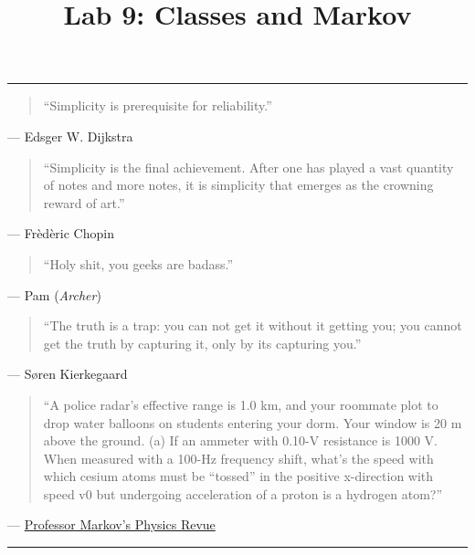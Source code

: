 \documentclass[11pt]{cselabheader}
\title{Lab 9: Classes and Markov}
\begin{document}
\maketitle

\hrule
\begin{quotation}
``Simplicity is prerequisite for reliability.''
\end{quotation}
\begin{flushright}
--- Edsger W. Dijkstra
\end{flushright}

\begin{quotation}
``Simplicity is the final achievement. After one has played a vast quantity of
notes and more notes, it is simplicity that emerges as the crowning reward of
art.''
\end{quotation}
\begin{flushright}
--- Fr\`ed\`eric Chopin
\end{flushright}

\begin{quotation}
``Holy shit, you geeks are badass.''
\end{quotation}
\begin{flushright}
  --- Pam (\emph{Archer})
\end{flushright}

\begin{quotation}
``The truth is a trap: you can not get it without it getting you; you cannot get
the truth by capturing it, only by its capturing you.''
\end{quotation}
\begin{flushright}
--- S{\o}ren Kierkegaard
\end{flushright}

\begin{quotation}
  ``A police radar’s effective range is 1.0 km, and your roommate plot to drop water balloons on students entering your dorm. Your window is 20 m above the ground. (a) If an ammeter with 0.10-V resistance is 1000 V. When measured with a 100-Hz frequency shift, what’s the speed with which cesium atoms must be “tossed” in the positive x-direction with speed v0 but undergoing acceleration of a proton is a hydrogen atom?''
\end{quotation}
\begin{flushright}
  --- \href{http://infohost.nmt.edu/~rkelly/physbot.html}{Professor Markov's Physics Revue}
\end{flushright}

\hrule
\end{document}
